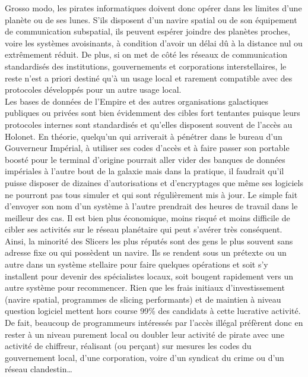 \documentclass[twoside]{article}
\begin{document}
Grosso modo, les pirates informatiques doivent donc opérer dans les limites d'une planète ou de ses lunes. S'ils disposent d'un navire spatial ou de son équipement de communication subspatial, ils peuvent espérer joindre des planètes proches, voire les systèmes avoisinants, à condition d'avoir un délai dû à la distance nul ou extrêmement réduit. De plus, si on met de côté les réseaux de communication standardisés des institutions, gouvernements et corporations interstellaires, le reste n'est a priori destiné qu'à un usage local et rarement compatible avec des protocoles développés pour un autre usage local.\\

Les bases de données de l'Empire et des autres organisations galactiques publiques ou privées sont bien évidemment des cibles fort tentantes puisque leurs protocoles internes sont standardisés et qu'elles disposent souvent de l'accès au Holonet. En théorie, quelqu'un qui arriverait à pénétrer dans le bureau d'un Gouverneur Impérial, à utiliser ses codes d'accès et à faire passer son portable boosté pour le terminal d'origine pourrait aller vider des banques de données impériales à l'autre bout de la galaxie mais dans la pratique, il faudrait qu'il puisse disposer de dizaines d'autorisations et d'encryptages que même ses logiciels ne pourront pas tous simuler et qui sont régulièrement mis à jour. Le simple fait d'envoyer son nom d'un système à l'autre prendrait des heures de travail dans le meilleur des cas.
Il est bien plus économique, moins risqué et moins difficile de cibler ses activités sur le réseau planétaire qui peut s'avérer très conséquent.\\

Ainsi, la minorité des Slicers les plus réputés sont des gens le plus souvent sans adresse fixe ou qui possèdent un navire. Ils se rendent sous un prétexte ou un autre dans un système stellaire pour faire quelques opérations et soit s'y installent pour devenir des spécialistes locaux, soit bougent rapidement vers un autre système pour recommencer. Rien que les frais initiaux d'investissement (navire spatial, programmes de slicing performants) et de maintien à niveau question logiciel mettent hors course 99\% des candidats à cette lucrative activité.
De fait, beaucoup de programmeurs intéressés par l'accès illégal préfèrent donc en rester à un niveau purement local ou doubler leur activité de pirate avec une activité de chiffreur, réalisant (ou perçant) sur mesures les codes du gouvernement local, d'une corporation, voire d'un syndicat du crime ou d'un réseau clandestin\ldots\\
\end{document}
